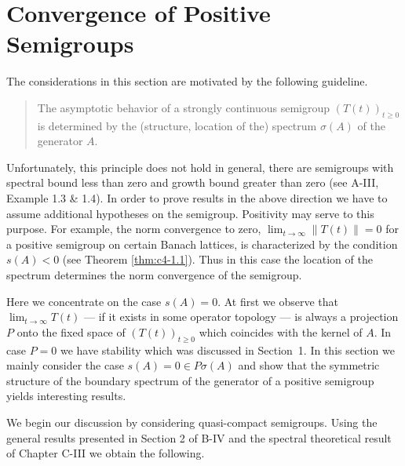 \section{Convergence of Positive Semigroups}\label{sec:c4-2}
%
\hspace{1cm}{\Large by Günther Greiner und Rainer Nagel}
\vspace{.5cm}
\newline
The considerations in this section are motivated by the following guideline.
\begin{quote} 
The asymptotic behavior of a strongly continuous semigroup $(T(t))_{t \geq 0}$ is determined by the (structure, location of the) spectrum $\sigma(A)$ of the generator $A$.
\end{quote}
Unfortunately, this principle does not hold in general, \eg  there are semigroups with spectral bound less than zero and growth bound greater than zero (see A-III, Example 1.3 \& 1.4).
In order to prove results in the above direction we have to assume additional hypotheses on the semigroup.
Positivity may serve to this purpose.
For example, the norm convergence to zero, \ie  $\lim_{t \to \infty} \|T(t)\| = 0$ for a positive semigroup on certain Banach lattices, is characterized by the condition $s(A) < 0$ (see Theorem \ref{thm:c4-1.1}).
Thus in this case the location of the spectrum determines the norm convergence of the semigroup.

Here we concentrate on the case $s(A) = 0$.
At first we observe that
$\lim_{t \to \infty} T(t)$ --- if it exists in some operator topology --- is always a projection $P$ onto the fixed space of $(T(t))_{t \geq 0}$ which coincides with the kernel of $A$.
In case $P = 0$ we have stability which was discussed in Section~1.
In this section we mainly consider the case $s(A) = 0 \in P{\sigma}(A)$ and show that the symmetric structure of the boundary spectrum of the generator of a positive semigroup yields interesting results.

We begin our discussion by considering quasi-compact semigroups.
Using the general results presented in Section 2 of B-IV and the spectral theoretical result of Chapter C-III we obtain the following.

